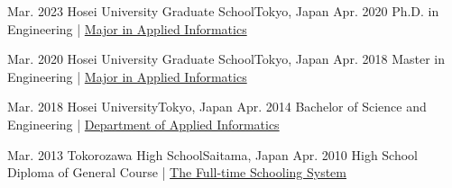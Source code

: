 
\begin{educations}
    \education
    {Mar. 2023} {Hosei University Graduate School}{Tokyo, Japan}{}
    {Apr. 2020} {Ph.D. in Engineering | \href{https://www.hosei.ac.jp/english/admissions/graduate/jbdp/science_engineering/applied_informatics/}{Major in Applied Informatics}}

    \emptySeparator
    \education
    {Mar. 2020} {Hosei University Graduate School}{Tokyo, Japan}{}
    {Apr. 2018} {Master in Engineering | \href{https://www.hosei.ac.jp/english/admissions/graduate/jbdp/science_engineering/applied_informatics/}{Major in Applied Informatics}}

    \emptySeparator
    \education
    {Mar. 2018} {Hosei University}{Tokyo, Japan}{}
    {Apr. 2014} {Bachelor of Science and Engineering | \href{https://www.hosei.ac.jp/english/admissions/undergraduate/jbdp/faculty/science/informatics}{Department of Applied Informatics}}

    \emptySeparator
    \education
    {Mar. 2013} {Tokorozawa High School}{Saitama, Japan}{}
    {Apr. 2010} {High School Diploma of General Course | \href{https://tokorozawa-h.spec.ed.jp/4a5b5eb928f160aab68b88bb6f6a2b42}{The Full-time Schooling System}}
\end{educations}
